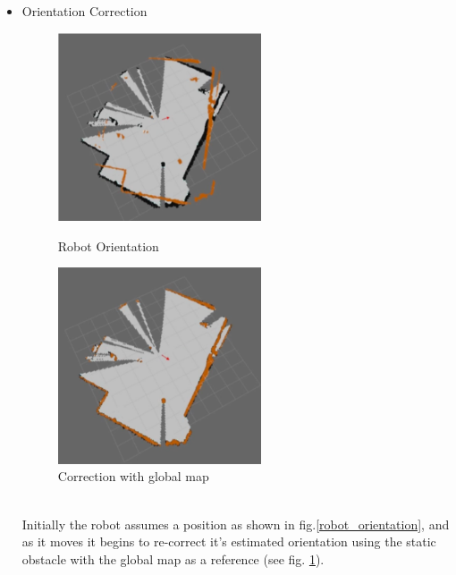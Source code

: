 \begin{itemize}
	\item Orientation Correction
	\begin{figure}[!htbp]
		\centering
		\begin{minipage}{.5\textwidth}
			\centering
			\includegraphics[width = 6cm]{Pictures/robotorientation}%
			\caption[The ListOfFigures caption]{Robot Orientation \footnotemark[1]}
			\label{robot_orientation}
		\end{minipage}%
		\begin{minipage}{.5\textwidth}
			\centering
			\includegraphics[width = 6cm]{Pictures/correctionwithglobalmap}%
			\caption[The ListOfFigures caption]{Correction with global map \footnotemark[1]}
			\label{correction_with_globalmap}
		\end{minipage}
	\end{figure}\\
 	Initially the robot assumes a position as shown in fig.\ref{robot_orientation}, and as it moves it begins to re-correct it's estimated orientation using the static obstacle with the global map as a reference (see fig. \ref{correction_with_globalmap}). 
\end{itemize}

